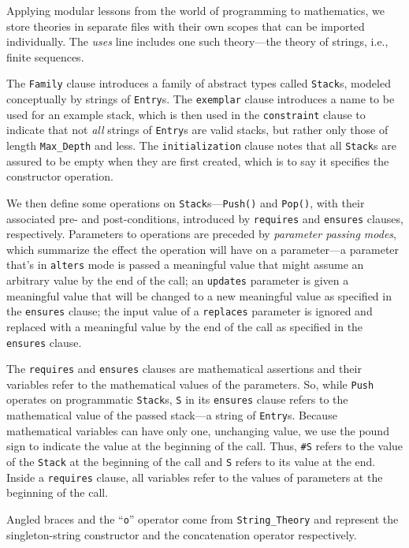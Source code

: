 Applying modular lessons from the world of programming to mathematics, we store theories in separate files with their own scopes that can be imported individually\cite{smith08}.  The \emph{uses} line includes one such theory---the theory of strings, i.e., finite sequences.

The \texttt{Family} clause introduces a family of abstract types called \texttt{Stack}s, modeled conceptually by strings of \texttt{Entry}s.  The \texttt{exemplar} clause introduces a name to be used for an example stack, which is then used in the \texttt{constraint} clause to indicate that not \emph{all} strings of \texttt{Entry}s are valid stacks, but rather only those of length \texttt{Max\_Depth} and less.  The \texttt{initialization} clause notes that all \texttt{Stack}s are assured to be empty when they are first created, which is to say it specifies the constructor operation.

We then define some operations on \texttt{Stack}s---\texttt{Push()} and \texttt{Pop()}, with their associated pre- and post-conditions, introduced by \texttt{requires} and \texttt{ensures} clauses, respectively.  Parameters to operations are preceded by \emph{parameter passing modes}, which summarize the effect the operation will have on a parameter---a parameter that's in \texttt{alters} mode is passed a meaningful value that might assume  an arbitrary value by the end of the call; an \texttt{updates} parameter is given a meaningful value that will be changed to a new meaningful value as specified in the \texttt{ensures} clause;  the input value of a \texttt{replaces} parameter is ignored and replaced with a meaningful value by the end of the call as specified in the \texttt{ensures} clause.

The \texttt{requires} and \texttt{ensures} clauses are mathematical assertions and their variables refer to the mathematical values of the parameters.  So, while \texttt{Push} operates on programmatic \texttt{Stack}s, \texttt{S} in its \texttt{ensures} clause refers to the mathematical value of the passed stack---a string of \texttt{Entry}s.  Because mathematical variables can have only one, unchanging value, we use the pound sign to indicate the value at the beginning of the call.  Thus, \texttt{\#S} refers to the value of the \texttt{Stack} at the beginning of the call and \texttt{S} refers to its value at the end.  Inside a \texttt{requires} clause, all variables refer to the values of parameters at the beginning of the call.

Angled braces and the ``\texttt{o}'' operator come from \texttt{String\_Theory} and represent the singleton-string constructor and the concatenation operator respectively.

